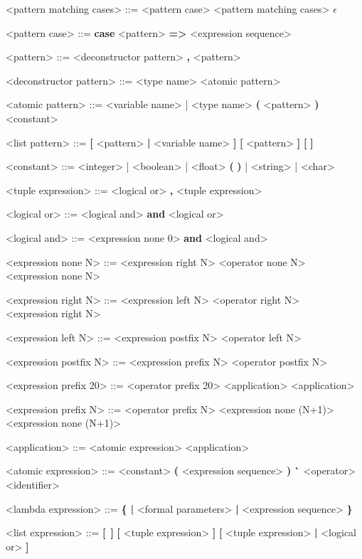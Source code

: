 \documentclass[12pt]{article}
\begin{document}
\begin{grammar}
<pattern matching cases> ::= <pattern case> <pattern matching cases>
    \alt $\epsilon$

<pattern case> ::= \textbf{case} <pattern> \textbf{=>} <expression sequence>

<pattern> ::= <deconstructor pattern>
     \textbf{,} <pattern>

<deconstructor pattern> ::= <type name> <atomic pattern>

<atomic pattern> ::= <variable name> | <type name>
    \alt \textbf{(} <pattern> \textbf{)}
    \alt <constant>

<list pattern> ::= \textbf{[} <pattern> \textbf{|} <variable name> \textbf{]}
    \alt \textbf{[} <pattern> \textbf{]}
    \alt \textbf{[\,\,]}

<constant> ::= <integer> | <boolean> | <float> 
    \alt \textbf{(\,\,)} | <string> | <char>

<tuple expression> ::= <logical or> \textbf{,} <tuple expression>

<logical or> ::= <logical and> \textbf{and} <logical or>

<logical and> ::= <expression none 0> \textbf {and} <logical and>

<expression none N> ::= <expression right N> <operator none N>\\ <expression none N>

<expression right N> ::= <expression left N> <operator right N>\\ <expression right N>

<expression left N> ::= <expression postfix N> <operator left N>\\<expression left N>

<expression postfix N> ::= <expression prefix N> <operator postfix N>

<expression prefix 20> ::= <operator prefix 20> <application>
    \alt <application>

<expression prefix N> ::= <operator prefix N> <expression none (N+1)>
    \alt <expression none (N+1)>

<application> ::= <atomic expression> <application>

<atomic expression> ::= <constant>
    \alt \textbf{(} <expression sequence> \textbf{)}
    \alt \textbf{\`} <operator>
    \alt <identifier>

<lambda expression> ::= \textbf{\{ |} <formal parameters> \textbf{|} <expression sequence> \textbf{\}}

<list expression> ::= \textbf{[} \,\textbf{]}
    \alt \textbf{[} <tuple expression> \textbf{]}
    \alt \textbf{[} <tuple expression> \textbf{|} <logical or> \textbf{]}

\end{grammar}
\end{document}
